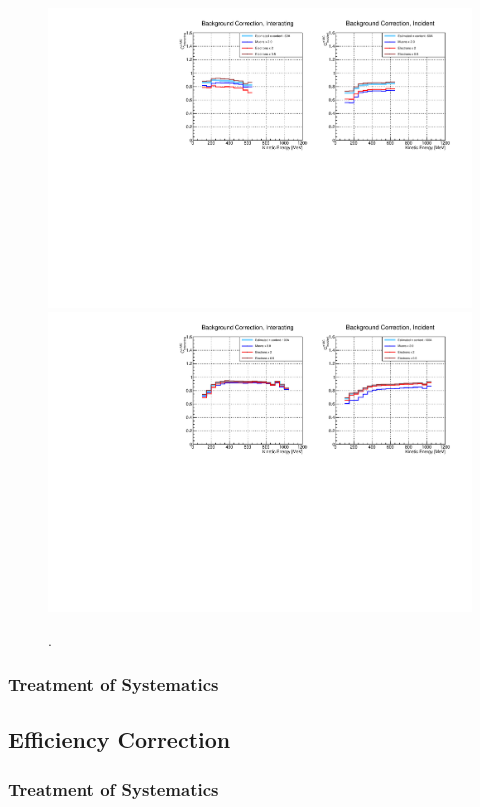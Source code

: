 \begin{figure}[htb]
\centering
\includegraphics[width=\textwidth]{Chapter-6/Images/Bkg60A_inc_int.pdf}
\includegraphics[width=\textwidth]{Chapter-6/Images/Bkg100A_inc_int.pdf}
\caption{.}
\label{fig:BkgCorr}
\end{figure}


\subsubsection{Treatment of Systematics}


\subsection{Efficiency Correction}
\subsubsection{Treatment of Systematics}



